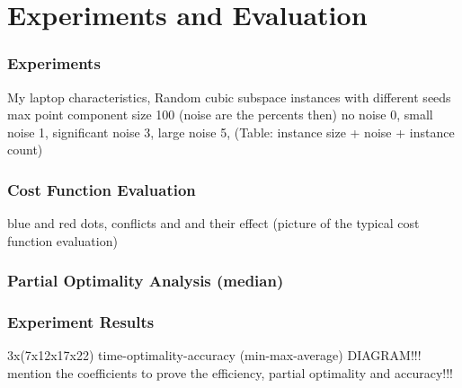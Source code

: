 \section{Experiments and Evaluation}
\frame{\tableofcontents[currentsection]}


\begin{frame}
    \frametitle{Experiments}
    My laptop characteristics, 
    Random cubic subspace instances with different seeds 
    max point component size 100 (noise are the percents then)
    no noise 0,
    small noise 1,
    significant noise 3,
    large noise 5,
    (Table: instance size + noise + instance count)
\end{frame}


\begin{frame}
    \frametitle{Cost Function Evaluation}
    blue and red dots,
    conflicts and and their effect
    (picture of the typical cost function evaluation)
\end{frame}

\begin{frame}
    \frametitle{Partial Optimality Analysis (median)}
\end{frame}

\begin{frame}
    \frametitle{Experiment Results}
    3x(7x12x17x22) time-optimality-accuracy (min-max-average) 
    DIAGRAM!!! 
    mention the coefficients to prove the efficiency, partial optimality and accuracy!!!
\end{frame}



